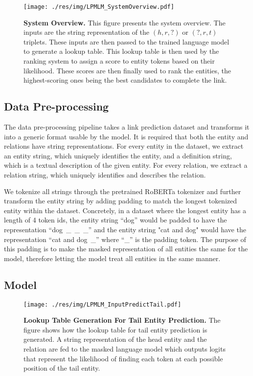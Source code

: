 \documentclass[11pt,a4paper]{article}
\newcommand{\Figure}[4]{\begin{figure}[H]
    \centering
    #1
    \captionsetup{
        labelfont=bf,
        justification=raggedright,
        singlelinecheck=off,
        width=.95\linewidth}
    \caption{\textbf{#3.} #4}
    \label{#2}
\end{figure}}
\begin{document}
\vspace{-1em}

\Figure
{\texttt{[image: ./res/img/LPMLM\_SystemOverview.pdf]}}
{fig:system_overview}
{System Overview}
{This figure presents the system overview.
The inputs are the string representation of the $(h, r, ?)$ or $(?, r, t)$ triplets.
These inputs are then passed to the trained language model to generate a lookup table. 
This lookup table is then used by the ranking system to assign a score to entity tokens based on their likelihood. 
These scores are then finally used to rank the entities, the highest-scoring ones being the best candidates to complete the link.
\vspace{-1.5em}
}

\subsection{Data Pre-processing}\label{sec:dataproc}


The data pre-processing pipeline takes a link prediction dataset and transforms it into a generic format usable by the model.
It is required that both the entity and relations have string representations.
For every entity in the dataset, we extract an entity string, which uniquely identifies the entity, and a definition string, which is a textual description of the given entity.
For every relation, we extract a relation string, which uniquely identifies and describes the relation.

We tokenize all strings through the pretrained RoBERTa tokenizer and further transform the entity string by adding padding to match the longest tokenized entity within the dataset.
Concretely, in a dataset where the longest entity has a length of 4 token ids, the entity string ``dog'' would be padded to have the representation ``dog~\_~\_~\_'' and the entity string "cat and dog" would have the representation ``cat and dog~\_'' where ``\_'' is the padding token. 
The purpose of this padding is to make the masked representation of all entities the same for the model, therefore letting the model treat all entities in the same manner.






\subsection{Model}

\Figure
{\texttt{[image: ./res/img/LPMLM\_InputPredictTail.pdf]}}
{fig:input_predict_tail}
{Lookup Table Generation For Tail Entity Prediction}
{The figure shows how the lookup table for tail entity prediction is generated. A string representation of the head entity and the relation are fed to the masked language model which outputs logits that represent the likelihood of finding each token at each possible position of the tail entity.
\vspace{-1em}
}
\end{document}

